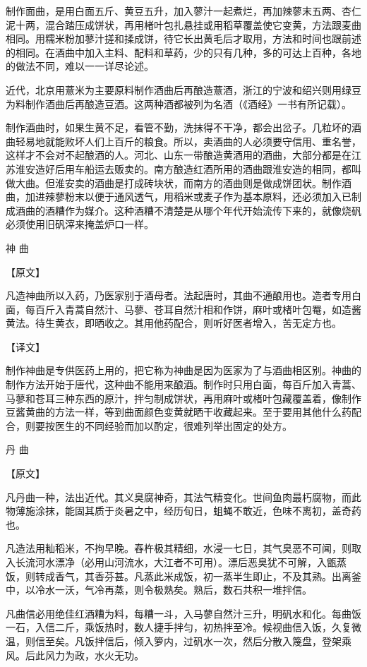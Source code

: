\documentclass[12pt,UTF8]{ctexbook}
\begin{document}
制作面曲，是用白面五斤、黄豆五升，加入蓼汁一起煮烂，再加辣蓼末五两、杏仁泥十两，混合踏压成饼状，再用楮叶包扎悬挂或用稻草覆盖使它变黄，方法跟麦曲相同。用糯米粉加蓼汁搓和揉成饼，待它长出黄毛后才取用，方法和时间也跟前述的相同。在酒曲中加入主料、配料和草药，少的只有几种，多的可达上百种，各地的做法不同，难以一一详尽论述。

近代，北京用薏米为主要原料制作酒曲后再酿造薏酒，浙江的宁波和绍兴则用绿豆为料制作酒曲后再酿造豆酒。这两种酒都被列为名酒（《酒经》一书有所记载）。

制作酒曲时，如果生黄不足，看管不勤，洗抹得不干净，都会出岔子。几粒坏的酒曲轻易地就能败坏人们上百斤的粮食。所以，卖酒曲的人必须要守信用、重名誉，这样才不会对不起酿酒的人。河北、山东一带酿造黄酒用的酒曲，大部分都是在江苏淮安造好后用车船运去贩卖的。南方酿造红酒所用的酒曲跟淮安造的相同，都叫做大曲。但淮安卖的酒曲是打成砖块状，而南方的酒曲则是做成饼团状。制作酒曲，加进辣蓼粉末以便于通风透气，用稻米或麦子作为基本原料，还必须加入已制成酒曲的酒糟作为媒介。这种酒糟不清楚是从哪个年代开始流传下来的，就像烧矾必须使用旧矾滓来掩盖炉口一样。

神 曲

【原文】

凡造神曲所以入药，乃医家别于酒母者。法起唐时，其曲不通酿用也。造者专用白面，每百斤入青蒿自然汁、马蓼、苍耳自然汁相和作饼，麻叶或楮叶包罨，如造酱黄法。待生黄衣，即晒收之。其用他药配合，则听好医者增入，苦无定方也。

【译文】

制作神曲是专供医药上用的，把它称为神曲是因为医家为了与酒曲相区别。神曲的制作方法开始于唐代，这种曲不能用来酿酒。制作时只用白面，每百斤加入青蒿、马蓼和苍耳三种东西的原汁，拌匀制成饼状，再用麻叶或楮叶包藏覆盖着，像制作豆酱黄曲的方法一样，等到曲面颜色变黄就晒干收藏起来。至于要用其他什么药配合，则要按医生的不同经验而加以酌定，很难列举出固定的处方。

丹 曲

【原文】

凡丹曲一种，法出近代。其义臭腐神奇，其法气精变化。世间鱼肉最朽腐物，而此物薄施涂抹，能固其质于炎暑之中，经历旬日，蛆蝇不敢近，色味不离初，盖奇药也。

凡造法用籼稻米，不拘早晚。舂杵极其精细，水浸一七日，其气臭恶不可闻，则取入长流河水漂净（必用山河流水，大江者不可用）。漂后恶臭犹不可解，入甑蒸饭，则转成香气，其香芬甚。凡蒸此米成饭，初一蒸半生即止，不及其熟。出离釜中，以冷水一沃，气冷再蒸，则令极熟矣。熟后，数石共积一堆拌信。

凡曲信必用绝佳红酒糟为料，每糟一斗，入马蓼自然汁三升，明矾水和化。每曲饭一石，入信二斤，乘饭热时，数人捷手拌匀，初热拌至冷。候视曲信入饭，久复微温，则信至矣。凡饭拌信后，倾入箩内，过矾水一次，然后分散入篾盘，登架乘风。后此风力为政，水火无功。
\end{document}
